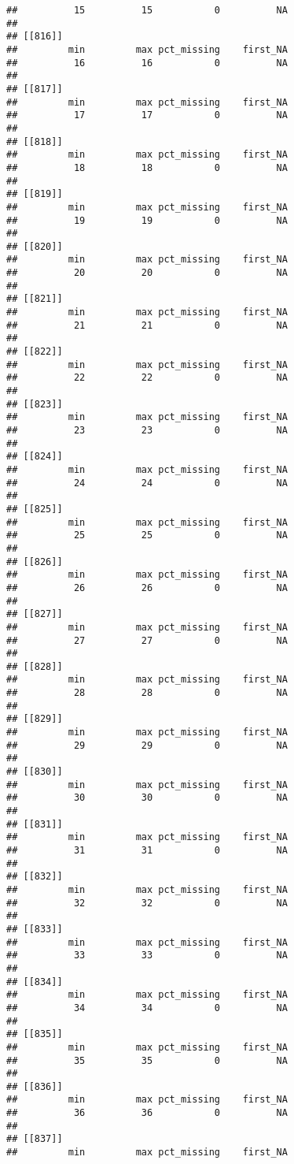 \documentclass[
]{article}
\begin{document}
\begin{verbatim}
##          15          15           0          NA 
## 
## [[816]]
##         min         max pct_missing    first_NA 
##          16          16           0          NA 
## 
## [[817]]
##         min         max pct_missing    first_NA 
##          17          17           0          NA 
## 
## [[818]]
##         min         max pct_missing    first_NA 
##          18          18           0          NA 
## 
## [[819]]
##         min         max pct_missing    first_NA 
##          19          19           0          NA 
## 
## [[820]]
##         min         max pct_missing    first_NA 
##          20          20           0          NA 
## 
## [[821]]
##         min         max pct_missing    first_NA 
##          21          21           0          NA 
## 
## [[822]]
##         min         max pct_missing    first_NA 
##          22          22           0          NA 
## 
## [[823]]
##         min         max pct_missing    first_NA 
##          23          23           0          NA 
## 
## [[824]]
##         min         max pct_missing    first_NA 
##          24          24           0          NA 
## 
## [[825]]
##         min         max pct_missing    first_NA 
##          25          25           0          NA 
## 
## [[826]]
##         min         max pct_missing    first_NA 
##          26          26           0          NA 
## 
## [[827]]
##         min         max pct_missing    first_NA 
##          27          27           0          NA 
## 
## [[828]]
##         min         max pct_missing    first_NA 
##          28          28           0          NA 
## 
## [[829]]
##         min         max pct_missing    first_NA 
##          29          29           0          NA 
## 
## [[830]]
##         min         max pct_missing    first_NA 
##          30          30           0          NA 
## 
## [[831]]
##         min         max pct_missing    first_NA 
##          31          31           0          NA 
## 
## [[832]]
##         min         max pct_missing    first_NA 
##          32          32           0          NA 
## 
## [[833]]
##         min         max pct_missing    first_NA 
##          33          33           0          NA 
## 
## [[834]]
##         min         max pct_missing    first_NA 
##          34          34           0          NA 
## 
## [[835]]
##         min         max pct_missing    first_NA 
##          35          35           0          NA 
## 
## [[836]]
##         min         max pct_missing    first_NA 
##          36          36           0          NA 
## 
## [[837]]
##         min         max pct_missing    first_NA 

\end{verbatim}
\end{document}
